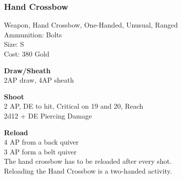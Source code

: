 \subsubsection{Hand Crossbow}\label{weapon:handCrossbow}
Weapon, Hand Crossbow, One-Handed, Unusual, Ranged\\
Ammunition: Bolts\\
Size: S\\
Cost: 380 Gold

\textbf{Draw/Sheath} \\
2AP draw, 4AP sheath

\textbf{Shoot} \\
2 AP, DE to hit, Critical on 19 and 20,  Reach\\
2d12 + \texttimes DE Piercing Damage

\textbf{Reload} \\
4 AP from a back quiver\\
3 AP form a belt quiver\\
The hand crossbow has to be reloaded after every shot.\\
Reloading the Hand Crossbow is a two-handed activity.

